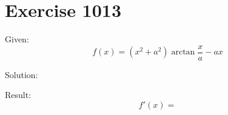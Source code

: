 \documentclass[a4paper, 10pt]{scrartcl}
\begin{document}
\section{Exercise 1013}

Given:
\[
f(x) = (x^{2} + a^{2})\arctan{\frac{x}{a}} - ax
\]

Solution:

Result:
\[
f'(x) =
\]
\end{document}

